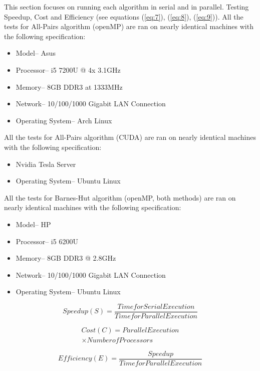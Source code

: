 This section focuses on running each algorithm in serial and in parallel. Testing Speedup, Cost and Efficiency (see equations (\ref{eq:7}), (\ref{eq:8}), (\ref{eq:9})). All the tests for All-Pairs algorithm (openMP) are ran on nearly identical machines with the following specification:
\begin{itemize}
\item Model{--} Asus
\item Processor{--} i5 7200U @ 4x 3.1GHz
\item Memory{--} 8GB DDR3 at 1333MHz
\item Network{--} 10/100/1000 Gigabit LAN Connection
\item Operating System{--} Arch Linux
\end{itemize}

All the tests for All-Pairs algorithm (CUDA) are ran on nearly identical machines with the following specification:
\begin{itemize}
\item Nvidia Tesla Server
\item Operating System{--} Ubuntu Linux
\end{itemize}

All the tests for Barnes-Hut algorithm (openMP, both methods) are ran on nearly identical machines with the following specification:
\begin{itemize}
\item Model{--} HP
\item Processor{--} i5 6200U
\item Memory{--} 8GB DDR3 @ 2.8GHz
\item Network{--} 10/100/1000 Gigabit LAN Connection
\item Operating System{--} Ubuntu Linux
\end{itemize}

\begin{equation} \label{eq:7}
Speedup (S) = \frac{Time for Serial Execution}{Time for Parallel Execution}
\end{equation}

\begin{multline} \label{eq:8}
Cost (C) = Parallel Execution \\
\times Number of Processors
\end{multline}

\begin{equation} \label{eq:9}
Efficiency (E) = \frac{Speedup}{Time for Parallel Execution}
\end{equation}
\BlankLine
